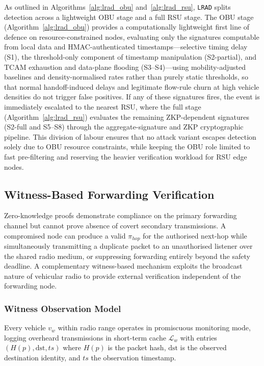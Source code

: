 \documentclass[12pt, a4paper]{report}
\begin{document}
As outlined in Algorithms~\ref{alg:lrad_obu} and~\ref{alg:lrad_rsu},
\texttt{LRAD} splits detection across a lightweight OBU stage and a full
RSU stage. The OBU stage (Algorithm~\ref{alg:lrad_obu}) provides a
computationally lightweight first line of defence on resource-constrained
nodes, evaluating only the signatures computable from local data and
HMAC-authenticated timestamps---selective timing delay (S1), the
threshold-only component of timestamp manipulation (S2-partial), and
TCAM exhaustion and data-plane flooding (S3--S4)---using mobility-adjusted
baselines and density-normalised rates rather than purely static
thresholds, so that normal handoff-induced delays and legitimate
flow-rule churn at high vehicle densities do not trigger false positives.
If any of these signatures fires, the event is immediately escalated to
the nearest RSU, where the full stage (Algorithm~\ref{alg:lrad_rsu})
evaluates the remaining ZKP-dependent signatures (S2-full and S5--S8)
through the aggregate-signature and ZKP cryptographic pipeline. This
division of labour ensures that no attack variant escapes detection
solely due to OBU resource constraints, while keeping the OBU role
limited to fast pre-filtering and reserving the heavier verification
workload for RSU edge nodes.

\subsection{Witness-Based Forwarding Verification}
\label{sec:witness}

Zero-knowledge proofs demonstrate compliance on the primary
forwarding channel but cannot prove absence of covert
secondary transmissions. A compromised node can produce a
valid $\pi_{hop}$ for the authorised next-hop while
simultaneously transmitting a duplicate packet to an
unauthorised listener over the shared radio medium, or
suppressing forwarding entirely beyond the safety deadline.
A complementary witness-based mechanism exploits the
broadcast nature of vehicular radio to provide external
verification independent of the forwarding node.

\subsubsection{Witness Observation Model}
Every vehicle $v_w$ within radio range operates in
promiscuous monitoring mode, logging overheard transmissions
in short-term cache $\mathcal{L}_w$ with entries
$(H(p), \text{dst}, ts)$ where $H(p)$ is the packet hash,
$\text{dst}$ is the observed destination identity, and
$ts$ the observation timestamp.
\end{document}
